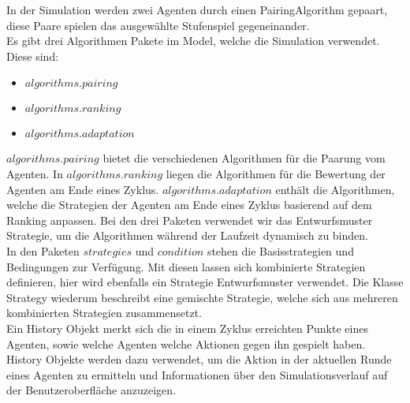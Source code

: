 In der Simulation werden zwei Agenten durch einen PairingAlgorithm gepaart, diese Paare spielen das ausgewählte Stufenspiel gegeneinander.\\

Es gibt drei Algorithmen Pakete im Model, welche die Simulation verwendet. Diese sind: 
\begin{itemize}
\item $algorithms.pairing$
\item $algorithms.ranking$
\item $algorithms.adaptation$
\end{itemize}
$algorithms.pairing$ bietet die verschiedenen Algorithmen für die Paarung vom Agenten. In $algorithms.ranking$ liegen die Algorithmen für die Bewertung der Agenten am Ende eines Zyklus. $algorithms.adaptation$ enthält die Algorithmen, welche die Strategien der Agenten am Ende eines Zyklus basierend auf dem Ranking anpassen. Bei den drei Paketen verwendet wir das Entwurfsmuster Strategie, um die Algorithmen während der Laufzeit dynamisch zu binden.\\

In den Paketen $strategies$ und $condition$ stehen die Basisstrategien und Bedingungen zur Verfügung. Mit diesen lassen sich kombinierte Strategien definieren, hier wird ebenfalls ein Strategie Entwurfsmuster verwendet. Die Klasse Strategy wiederum beschreibt eine gemischte Strategie, welche sich aus mehreren kombinierten Strategien zusammensetzt.\\

Ein History Objekt merkt sich die in einem Zyklus erreichten Punkte eines Agenten, sowie welche Agenten welche Aktionen gegen ihn gespielt haben. History Objekte werden dazu verwendet, um die Aktion in der aktuellen Runde eines Agenten zu ermitteln und Informationen über den Simulationsverlauf auf der Benutzeroberfläche anzuzeigen.
